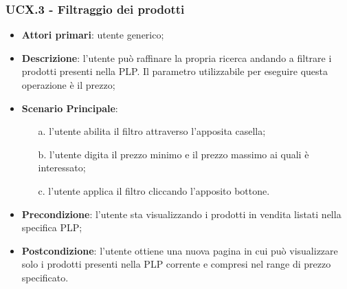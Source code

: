 \subsubsection{UCX.3 - Filtraggio dei prodotti}
\begin{itemize}
\item \textbf{Attori primari}: utente generico;
\item \textbf{Descrizione}: l'utente può raffinare la propria ricerca andando a filtrare i prodotti presenti nella PLP. Il parametro utilizzabile per eseguire questa operazione è il prezzo;
\item \textbf{Scenario Principale}:
\begin{enumerate}
\item[a.] l'utente abilita il filtro attraverso l'apposita casella;
\item[b.] l'utente digita il prezzo minimo e il prezzo massimo ai quali è interessato;
\item[c.] l'utente applica il filtro cliccando l'apposito bottone.
\end{enumerate}
\item \textbf{Precondizione}: l'utente sta visualizzando i prodotti in vendita listati nella specifica PLP;
\item \textbf{Postcondizione}: l'utente ottiene una nuova pagina in cui può visualizzare solo i prodotti presenti nella PLP corrente e compresi nel range di prezzo specificato.
\end{itemize}
